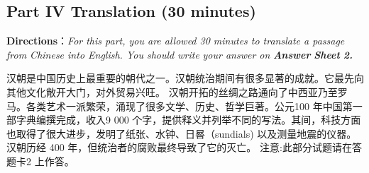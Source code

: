 \documentclass[UTF8,11pt]{ctexart}
\begin{document}
\subsection*{\textbf{Part} IV \textbf{Translation} \textbf{(30 minutes)}}


\textbf{Directions}：\textit{For this part, you are allowed 30 minutes to translate a passage from Chinese into English. You should write} \textit{your answer on}\textbf{\textit{ Answer}} \textbf{\textit{Sheet}} \textbf{\textit{2.}}


汉朝是中国历史上最重要的朝代之一。汉朝统治期间有很多显著的成就。它最先向其他文化敞开大门，对外贸易兴旺。 汉朝开拓的丝绸之路通向了中西亚乃至罗马。各类艺术一派繁荣，涌现了很多文学、历史、哲学巨著。公元100 年中国第一部字典编撰完成，收入9 000 个字，提供释义并列举不同的写法。其间，科技方面也取得了很大进步，发明了纸张、水钟、日晷（sundials) 以及测量地震的仪器。汉朝历经 400 年，但统治者的腐败最终导致了它的灭亡。 注意:此部分试题请在答题卡2 上作答。
\end{document}
